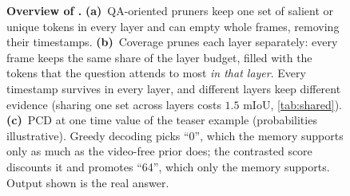 \begin{figure}[t]
{}
\caption{\textbf{Overview of \method.} \textbf{(a)}~QA-oriented pruners keep one set of salient or unique tokens in
every layer and can empty whole frames, removing their timestamps. \textbf{(b)}~Coverage prunes each layer
separately: every frame keeps the same share of the layer budget, filled with the tokens that the question attends to
most \emph{in that layer}. Every timestamp survives in every layer, and different layers keep different evidence
(sharing one set across layers costs $1.5$ mIoU, \cref{tab:shared}). \textbf{(c)}~PCD at one time value of the
teaser example (probabilities illustrative). Greedy decoding picks ``0'', which the memory supports only as much as
the video-free prior does; the contrasted score discounts it and promotes ``64'', which only the memory supports.
Output shown is the real \method answer.}
\label{fig:overview}
\end{figure}
